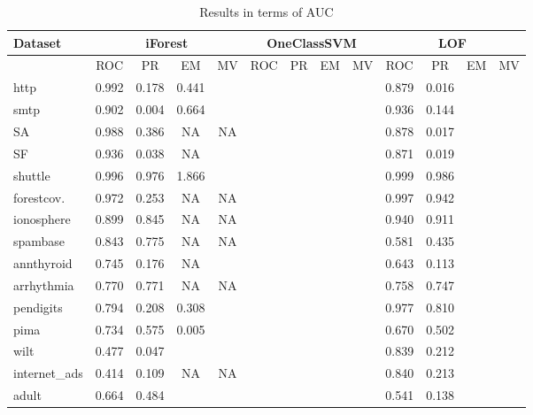 \begin{table}[!ht]
\centering
\begin{tabular}{|l|cccc|cccc|cccc|}
  \hline
Dataset      & \multicolumn{4}{c|}{iForest}& \multicolumn{4}{c|}{OneClassSVM}  & \multicolumn{4}{c|}{LOF} \\ %
  \hline
~            & ROC  & PR   & EM   &  MV    & ROC  & PR   & EM   & MV           & ROC  & PR   & EM   & MV  \\
http         &0.992 &0.178 &0.441 &        &      &      &      &              &0.879 &0.016 &      &     \\
smtp         &0.902 &0.004 &0.664 &        &      &      &      &              &0.936 &0.144 &      &     \\
SA           &0.988 &0.386 &  NA  &  NA    &      &      &      &              &0.878 &0.017 &      &     \\
SF           &0.936 &0.038 &  NA  &        &      &      &      &              &0.871 &0.019 &      &     \\
shuttle      &0.996 &0.976 &1.866 &        &      &      &      &              &0.999 &0.986 &      &     \\
forestcov.   &0.972 &0.253 &  NA  &  NA    &      &      &      &              &0.997 &0.942 &      &     \\
ionosphere   &0.899 &0.845 &  NA  &  NA    &      &      &      &              &0.940 &0.911 &      &     \\
spambase     &0.843 &0.775 &  NA  &  NA    &      &      &      &              &0.581 &0.435 &      &     \\
annthyroid   &0.745 &0.176 &  NA  &        &      &      &      &              &0.643 &0.113 &      &     \\
arrhythmia   &0.770 &0.771 &  NA  &  NA    &      &      &      &              &0.758 &0.747 &      &     \\
pendigits    &0.794 &0.208 &0.308 &        &      &      &      &              &0.977 &0.810 &      &     \\
pima         &0.734 &0.575 &0.005 &        &      &      &      &              &0.670 &0.502 &      &     \\
wilt         &0.477 &0.047 &      &        &      &      &      &              &0.839 &0.212 &      &     \\
internet\_ads&0.414 &0.109 &  NA  &  NA    &      &      &      &              &0.840 &0.213 &      &     \\
adult        &0.664 &0.484 &      &        &      &      &      &              &0.541 &0.138 &      &     \\
  \hline
\end{tabular}
\caption{Results in terms of AUC}
\label{back:table:results-semisupervised}
\end{table}


